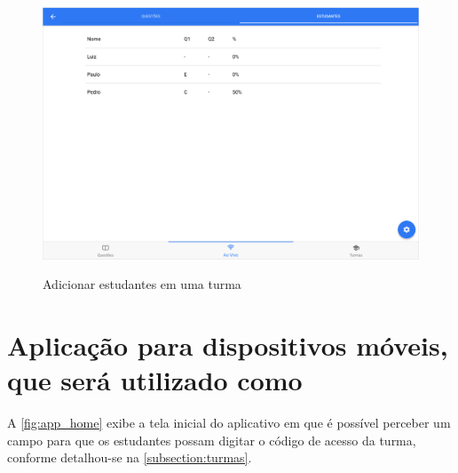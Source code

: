 \begin{figure}[ht]
  \centering
  \caption{Adicionar estudantes em uma turma}
  \includegraphics[scale=.4]{imagens/telas/session_students_details}
  \doautor
  \label{fig:session_students_details}
\end{figure}

\clearpage

\section{Aplicação para dispositivos móveis, que será utilizado como {\clickers}}

A \autoref{fig:app_home} exibe a tela inicial do aplicativo em que é possível perceber
um campo para que os estudantes possam digitar o código de acesso da turma, conforme detalhou-se
na \autoref{subsection:turmas}.

